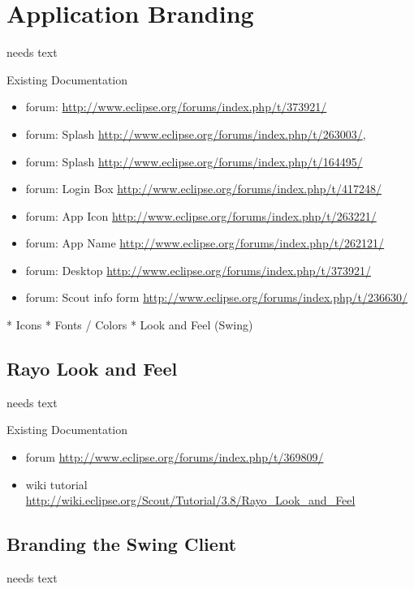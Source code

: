 \documentclass[a4paper,10pt,twoside]{book}
\begin{document}
{%
\chapter{Application Branding}
needs text

\noindent Existing Documentation
\begin{itemize}
  \item forum: \url{http://www.eclipse.org/forums/index.php/t/373921/}
  \item forum: Splash \url{http://www.eclipse.org/forums/index.php/t/263003/}, 
  \item forum: Splash \url{http://www.eclipse.org/forums/index.php/t/164495/}
  \item forum: Login Box \url{http://www.eclipse.org/forums/index.php/t/417248/}
  \item forum: App Icon \url{http://www.eclipse.org/forums/index.php/t/263221/}
  \item forum: App Name \url{http://www.eclipse.org/forums/index.php/t/262121/}
  \item forum: Desktop \url{http://www.eclipse.org/forums/index.php/t/373921/}
  \item forum: Scout info form \url{http://www.eclipse.org/forums/index.php/t/236630/}
\end{itemize}

* Icons
* Fonts / Colors
* Look and Feel (Swing)

\section{Rayo Look and Feel}
needs text

\noindent Existing Documentation
\begin{itemize}
  \item forum \url{http://www.eclipse.org/forums/index.php/t/369809/}
  \item wiki tutorial \url{http://wiki.eclipse.org/Scout/Tutorial/3.8/Rayo_Look_and_Feel}
\end{itemize}

\section{Branding the Swing Client}
needs text

}
\end{document}
